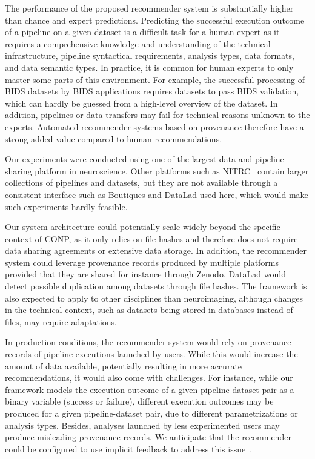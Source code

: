 \documentclass[conference]{IEEEtran}
\begin{document}
The performance of the proposed recommender system is substantially higher
than chance and expert predictions. Predicting the successful execution
outcome of a pipeline on a given dataset is a difficult task for a human
expert as it requires a comprehensive knowledge and understanding of the
technical infrastructure, pipeline syntactical requirements, analysis
types, data formats, and data semantic types. In practice, it is common for
human experts to only master some parts of this environment. For example,
the successful processing of BIDS datasets by BIDS applications requires
datasets to pass BIDS validation, which can hardly be guessed from a
high-level overview of the dataset. In addition, pipelines or data
transfers may fail for technical reasons unknown to the experts. Automated
recommender systems based on provenance therefore have a strong added value
compared to human recommendations. 

Our experiments were conducted using one of the largest data and pipeline
sharing platform in neuroscience. Other platforms such as
NITRC~\cite{kennedy2016nitrc} contain larger collections of
pipelines and datasets, but they are not available through a consistent
interface such as Boutiques and DataLad used here, which would make
such experiments hardly feasible.

Our system architecture could potentially scale widely beyond the specific
context of CONP, as it only relies on file hashes and therefore does not
require data sharing agreements or extensive data storage. In addition, the
recommender system could leverage provenance records produced by multiple
platforms provided that they are shared for instance through Zenodo.
DataLad would detect possible duplication among datasets through file hashes. 
The framework is also expected to apply to other disciplines than neuroimaging, 
although changes in the technical context, such as datasets being stored in 
databases instead of files, may require adaptations.

In production conditions, the recommender system would rely on provenance
records of pipeline executions launched by users. While this would increase
the amount of data available, potentially resulting in more accurate
recommendations, it would also come with challenges. For instance, while
our framework models the execution outcome of a given pipeline-dataset pair
as a binary variable (success or failure), different execution outcomes may
be produced for a given pipeline-dataset pair, due to different
parametrizations or analysis types. Besides, analyses launched by less
experimented users may produce misleading provenance records. We anticipate
that the recommender could be configured to use implicit feedback to address 
this issue~\cite{hu2008collaborative}.
\end{document}
